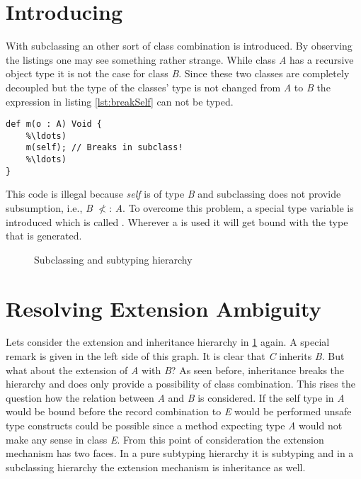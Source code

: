 
\section{Introducing \mytype}
With subclassing an other sort of class combination is introduced. By
observing the listings  one may see something rather strange. While
class \emph{A} has a recursive object type it is not the case for
class \emph{B}. Since these two classes are completely decoupled but
the type of the classes' type is not changed from \emph{A} to \emph{B}
the expression in listing \ref{lst:breakSelf} can not be typed.

\begin{lstlisting}[float,language=ooplss,caption=Illegal method m(o : \emph{A}) : \emph{Void} in class \emph{B},label=lst:breakSelf]
def m(o : A) Void {
	%\ldots)
	m(self); // Breaks in subclass!
	%\ldots)
}
\end{lstlisting}

This code is illegal because \emph{self} is of type \emph{B} and
subclassing does not provide subsumption, i.e., \emph{B} $\nless$:
\emph{A}. To overcome this problem, a special type variable is
introduced which is called \mytype. Wherever a \mytype is used it will
get bound with the type that is generated.

\begin{figure}[h]
	\centering
	\caption{Subclassing and subtyping hierarchy}
	\label{fig:hierarchy}
\end{figure}

\section{Resolving Extension Ambiguity}
\label{sec:resolveAmbiguity}
Lets consider the extension and inheritance hierarchy in \cref{fig:hierarchy}
again. A special remark is given in the left side of this graph. It is clear
that \emph{C} inherits \emph{B}. But what about the extension of \emph{A} 
with \emph{B}? As seen before, inheritance breaks the hierarchy and does only
provide a possibility of class combination. This rises the question how the 
relation between \emph{A} and \emph{B} is considered. If the self type in 
\emph{A} would be bound before the record combination to \emph{E} would be
performed unsafe type constructs could be possible since a method expecting 
type \emph{A} would not make any sense in class \emph{E}. From this point of 
consideration the extension mechanism has two faces. In a pure subtyping 
hierarchy it is subtyping and in a subclassing hierarchy the extension
mechanism is inheritance as well.

